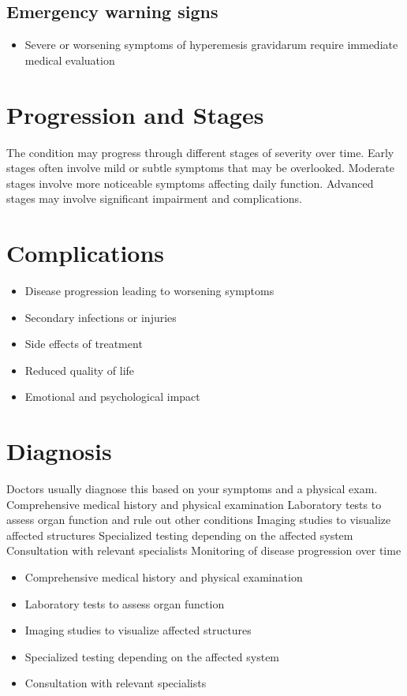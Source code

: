 \subsection{Emergency warning signs}
\begin{itemize}[noitemsep]
  \item Severe or worsening symptoms of hyperemesis gravidarum require immediate medical evaluation
\end{itemize}
\section{Progression and Stages}
The condition may progress through different stages of severity over time. Early stages often involve mild or subtle symptoms that may be overlooked. Moderate stages involve more noticeable symptoms affecting daily function. Advanced stages may involve significant impairment and complications.
\section{Complications}
\begin{itemize}[noitemsep]
  \item Disease progression leading to worsening symptoms
  \item Secondary infections or injuries
  \item Side effects of treatment
  \item Reduced quality of life
  \item Emotional and psychological impact
\end{itemize}
\section{Diagnosis}
Doctors usually diagnose this based on your symptoms and a physical exam. Comprehensive medical history and physical examination Laboratory tests to assess organ function and rule out other conditions Imaging studies to visualize affected structures Specialized testing depending on the affected system Consultation with relevant specialists Monitoring of disease progression over time

\begin{itemize}[noitemsep]
  \item Comprehensive medical history and physical examination
  \item Laboratory tests to assess organ function
  \item Imaging studies to visualize affected structures
  \item Specialized testing depending on the affected system
  \item Consultation with relevant specialists
\end{itemize}
